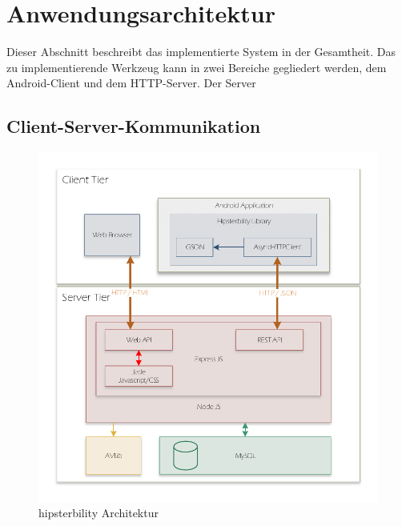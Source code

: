 \section{Anwendungsarchitektur}
\label{app_architecture}
Dieser Abschnitt beschreibt das implementierte System in der Gesamtheit. Das zu implementierende Werkzeug kann in zwei Bereiche gegliedert werden, dem Android-Client und dem HTTP-Server. Der Server

\subsection{Client-Server-Kommunikation}

\begin{figure}[h]
	\label{fig:architecture}
	\includegraphics[width=\linewidth]{img/architecture}
	\caption{hipsterbility Architektur}
\end{figure}

